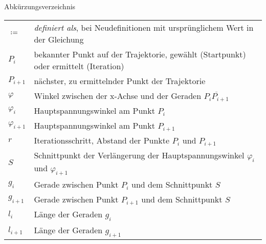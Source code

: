 {\large Abkürzungsverzeichnis}\\

{\small \begin{tabular}[t]{ll}
	$\coloneqq$ & \textit{definiert als}, bei Neudefinitionen mit ursprünglichem Wert in der Gleichung\\
	$P_{i}$ & bekannter Punkt auf der Trajektorie, gewählt (Startpunkt) oder ermittelt (Iteration)\\
	$P_{i+1}$ & nächster, zu ermittelnder Punkt der Trajektorie\\
	$\varphi$ & Winkel zwischen der x-Achse und der Geraden $\overline{P_{i}P_{i+1}}$\\
	$\varphi_{i}$ & Hauptspannungswinkel am Punkt $P_{i}$ \\
	$\varphi_{i+1}$ & Hauptspannungswinkel am Punkt $P_{i+1}$ \\
	$r$ & Iterationsschritt, Abstand der Punkte $P_{i}$ und $P_{i+1}$\\
	$S$ & Schnittpunkt der Verlängerung der Hauptspannungswinkel $\varphi_{i}$ und $\varphi_{i+1}$\\
	$g_{i}$ & Gerade zwischen Punkt $P_{i}$ und dem Schnittpunkt $S$ \\
	$g_{i+1}$ & Gerade zwischen Punkt $P_{i+1}$ und dem Schnittpunkt $S$ \\
	$l_{i}$ & Länge der Geraden $g_{i}$\\
	$l_{i+1}$ & Länge der Geraden $g_{i+1}$\\
\end{tabular}}
\clearpage
